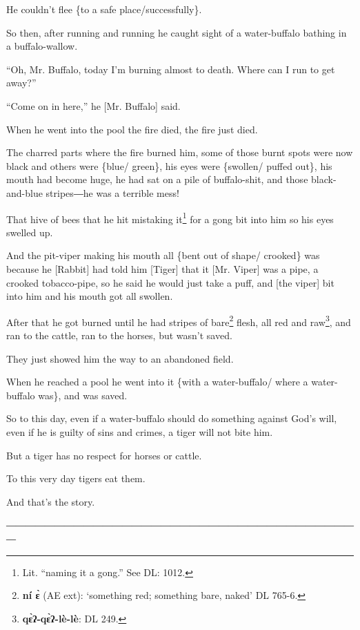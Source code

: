 He couldn't flee \{to a safe place/successfully\}.

So then, after running and running he caught sight of a water-buffalo bathing in
a buffalo-wallow.

``Oh, Mr. Buffalo, today I'm burning almost to death. Where can I run to get away?''

``Come on in here,'' he [Mr. Buffalo] said.

When he went into the pool the fire died, the fire just died.

The charred parts where the fire burned him, some of those burnt spots were now
black and others were \{blue/ green\}, his eyes were \{swollen/ puffed out\}, his
mouth had become huge, he had sat on a pile of buffalo-shit, and those black-and-blue
stripes―he was a terrible mess!

That hive of bees that he hit mistaking it\footnote{Lit. ``naming it a gong.'' See DL: 1012.} for a gong bit into him so his eyes
swelled up.

And the pit-viper making his mouth all \{bent out of shape/ crooked\} was because
he [Rabbit] had told him [Tiger] that it [Mr. Viper] was a pipe, a crooked tobacco-pipe,
so he said he would just take a puff, and [the viper] bit into him and his mouth
got all swollen.

After that he got burned until he had stripes of bare\footnote{\textbf{ní ɛ̀} (AE ext): `something red; something bare, naked' DL 765-6.} flesh, all red and raw\footnote{\textbf{qɛ̀ʔ-qɛ̀ʔ-lè-lè}: DL 249.},
and ran to the cattle, ran to the horses, but wasn't saved.

They just showed him the way to an abandoned field.

When he reached a pool he went into it \{with a water-buffalo/ where a water-buffalo
was\}, and was saved.

So to this day, even if a water-buffalo should do something against God's will,
even if he is guilty of sins and crimes, a tiger will not bite him.

But a tiger has no respect for horses or cattle.

To this very day tigers eat them.

And that's the story.

―――――――――――――――――――――――――――――――――――――\leftskip=14pt
